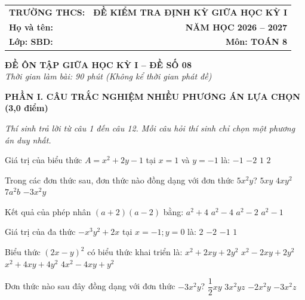 \documentclass[12pt,a4paper]{article}
\begin{document}
\noindent
\begin{tabularx}{\linewidth}{X r}
\textbf{TRƯỜNG THCS: \dotfill} & \textbf{ĐỀ KIỂM TRA ĐỊNH KỲ GIỮA HỌC KỲ I} \\
\textbf{Họ và tên: \dotfill} & \textbf{NĂM HỌC 2026 -- 2027} \\
\textbf{Lớp: \dotfill \quad SBD: \dotfill} & \textbf{Môn: TOÁN 8} \\
\hline
\end{tabularx}
\vspace{2mm}

\begin{center}
  \textbf{\large ĐỀ ÔN TẬP GIỮA HỌC KỲ I -- ĐỀ SỐ 08}\\
  \textit{Thời gian làm bài: 90 phút (Không kể thời gian phát đề)}
\end{center}
\vspace{1mm}

\noindent\textbf{\large PHẦN I. CÂU TRẮC NGHIỆM NHIỀU PHƯƠNG ÁN LỰA CHỌN (3,0 điểm)}

\textit{Thí sinh trả lời từ câu 1 đến câu 12. Mỗi câu hỏi thí sinh chỉ chọn một phương án duy nhất.}

\vspace{1mm}
\begin{ex}
Giá trị của biểu thức $A = x^2 + 2y - 1$ tại $x = 1$ và $y = -1$ là:
\choice
{$-1$}
{\True $-2$}
{$1$}
{$2$}
\end{ex}

\begin{ex}
Trong các đơn thức sau, đơn thức nào đồng dạng với đơn thức $5x^2y$?
\choice
{$5xy$}
{$4xy^2$}
{$7a^2b$}
{\True $-3x^2y$}
\end{ex}

\begin{ex}
Kết quả của phép nhân $(a + 2)(a - 2)$ bằng:
\choice
{$a^2 + 4$}
{\True $a^2 - 4$}
{$a^2 - 2$}
{$a^2 - 1$}
\end{ex}

\begin{ex}
Giá trị của đa thức $-x^3y^2 + 2x$ tại $x = -1; y = 0$ là:
\choice
{$2$}
{\True $-2$}
{$-1$}
{$1$}
\end{ex}

\begin{ex}
Biểu thức $(2x - y)^2$ có biểu thức khai triển là:
\choice
{$x^2 + 2xy + 2y^2$}
{$x^2 - 2xy + 2y^2$}
{$x^2 + 4xy + 4y^2$}
{\True $4x^2 - 4xy + y^2$}
\end{ex}

\begin{ex}
Đơn thức nào sau đây đồng dạng với đơn thức $-3x^2y$?
\choice
{$\dfrac{1}{2}xy$}
{$3x^2yz$}
{\True $-2x^2y$}
{$-3x^2z$}
\end{ex}
\end{document}
